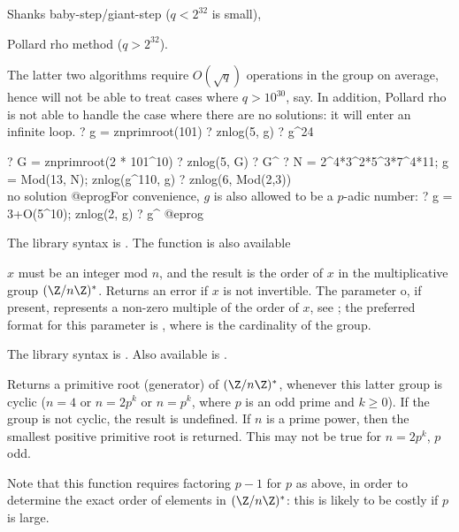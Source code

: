 \item Shanks baby-step/giant-step ($q < 2^{32}$ is small),

\item Pollard rho method ($q > 2^{32}$).

The latter two algorithms require $O(\sqrt{q})$ operations in the group on
average, hence will not be able to treat cases where $q > 10^{30}$, say.
In addition, Pollard rho is not able to handle the case where there are no
solutions: it will enter an infinite loop.
\bprog
? g = znprimroot(101)
? znlog(5, g)
? g^24

? G = znprimroot(2 * 101^10)
? znlog(5, G)
? G^%
? N = 2^4*3^2*5^3*7^4*11; g = Mod(13, N); znlog(g^110, g)
? znlog(6, Mod(2,3))  \\ no solution
@eprog\noindent For convenience, $g$ is also allowed to be a $p$-adic number:
\bprog
? g = 3+O(5^10); znlog(2, g)
? g^%
@eprog

The library syntax is .
The function
 is also available

\label{se:znorder}
$x$ must be an integer mod $n$, and the
result is the order of $x$ in the multiplicative group $(\Z/n\Z)^*$. Returns
an error if $x$ is not invertible.
The parameter o, if present, represents a non-zero
multiple of the order of $x$, see ; the preferred format for
this parameter is , where 
is the cardinality of the group.

The library syntax is .
Also available is .

\label{se:znprimroot}
Returns a primitive root (generator) of $(\Z/n\Z)^*$, whenever this
latter group is cyclic ($n = 4$ or $n = 2p^k$ or $n = p^k$, where $p$ is an
odd prime and $k \geq 0$). If the group is not cyclic, the result is
undefined. If $n$ is a prime power, then the smallest positive primitive
root is returned. This may not be true for $n = 2p^k$, $p$ odd.

Note that this function requires factoring $p-1$ for $p$ as above,
in order to determine the exact order of elements in
$(\Z/n\Z)^*$: this is likely to be costly if $p$ is large.


